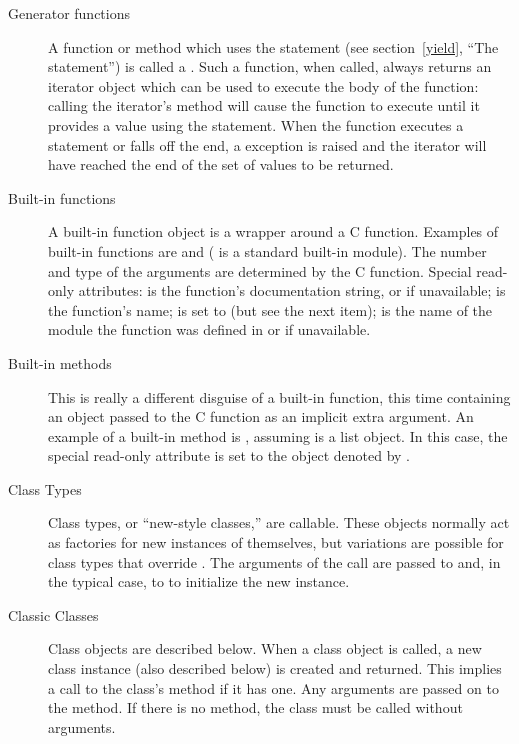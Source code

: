 \begin{description}
\begin{description}
\item[Generator functions]
A function or method which uses the  statement (see
section~\ref{yield}, ``The  statement'') is called a
.  Such a function, when called, always
returns an iterator object which can be used to execute the body of
the function:  calling the iterator's  method will
cause the function to execute until it provides a value using the
 statement.  When the function executes a
 statement or falls off the end, a
 exception is raised and the iterator will
have reached the end of the set of values to be returned.

\item[Built-in functions]
A built-in function object is a wrapper around a C function.  Examples
of built-in functions are  and 
( is a standard built-in module).
The number and type of the arguments are
determined by the C function.
Special read-only attributes:  is the function's
documentation string, or  if unavailable; 
is the function's name;  is set to  (but see
the next item);  is the name of the module the
function was defined in or  if unavailable.

\item[Built-in methods]
This is really a different disguise of a built-in function, this time
containing an object passed to the C function as an implicit extra
argument.  An example of a built-in method is
, assuming
 is a list object.
In this case, the special read-only attribute  is set
to the object denoted by .

\item[Class Types]
Class types, or ``new-style classes,'' are callable.  These objects
normally act as factories for new instances of themselves, but
variations are possible for class types that override
.  The arguments of the call are passed to
 and, in the typical case, to  to
initialize the new instance.

\item[Classic Classes]
Class objects are described below.  When a class object is called,
a new class instance (also described below) is created and
returned.  This implies a call to the class's  method
if it has one.  Any arguments are passed on to the 
method.  If there is no  method, the class must be called
without arguments.


\end{description}
\end{description}
